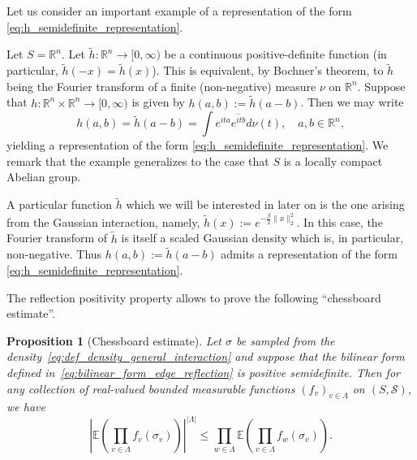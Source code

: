 \documentclass[12pt,reqno]{article}
\def\R{\mathbb{R}}
\def\E{\mathbb{E}}
\def\cS{\mathcal{S}}
\newtheorem{proposition}[theorem]{Proposition}
\begin{document}
Let us consider an important example of a representation of the form \eqref{eq:h_semidefinite_representation}.

\smallskip
{} Let $S = \R^n$. Let $\tilde{h}:\R^n\to[0,\infty)$ be a continuous positive-definite function (in particular, $\tilde{h}(-x)=\tilde{h}(x)$). This is equivalent, by Bochner's theorem, to $\tilde{h}$ being the Fourier transform of a finite (non-negative) measure $\nu$ on $\R^n$. Suppose that $h \colon \R^n \times \R^n \to [0,\infty)$ is given by $h(a,b) := \tilde{h}(a-b)$. Then we may write
\begin{equation*}
  h(a,b) = \tilde{h}(a-b) = \int e^{ita}\overline{e^{itb}}d\nu(t),\quad a,b\in\R^n,
\end{equation*}
yielding a representation of the form \eqref{eq:h_semidefinite_representation}. We remark that the example generalizes to the case that $S$ is a locally compact Abelian group.

A particular function $\tilde{h}$ which we will be interested in later on is the one arising from the Gaussian interaction, namely, $\tilde{h}(x) := e^{-\frac{\beta}{2}\|x\|_2^2}$. In this case, the Fourier transform of $\tilde{h}$ is itself a scaled Gaussian density which is, in particular, non-negative. Thus $h(a,b):=\tilde{h}(a-b)$ admits a representation of the form \eqref{eq:h_semidefinite_representation}.
\medskip


The reflection positivity property allows to prove the following ``chessboard estimate''.

\begin{proposition}[Chessboard estimate]\label{prop:chessboard_estimate_edges}
	Let $\sigma$ be sampled from the density~\eqref{eq:def_density_general_interaction} and suppose that the bilinear form defined in~\eqref{eq:bilinear_form_edge_reflection} is positive semidefinite.
	Then for any collection of real-valued bounded measurable functions $(f_v)_{v \in \Lambda}$ on $(S,\cS)$, we have
	\[ \left|\E\left(\prod_{v \in \Lambda} f_v(\sigma_v) \right)\right|^{|\Lambda|} \le \prod_{w \in \Lambda} \E\left(\prod_{v \in \Lambda} f_w(\sigma_v)\right) .\]
\end{proposition}
\end{document}
